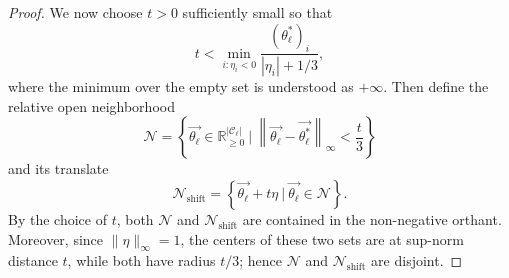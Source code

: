 \documentclass[pdflatex,sn-mathphys-num]{sn-jnl}%
\theoremstyle{thmstyleone}%
\theoremstyle{thmstyletwo}%
\theoremstyle{thmstylethree}%
\begin{document}
\begin{appendices}
\begin{proof}
    We now choose $t>0$ sufficiently small so that
    \[
        t < \min_{i:\eta_i<0} \frac{(\theta^*_\ell)_i}{|\eta_i| + 1/3},
    \]
    where the minimum over the empty set is understood as $+\infty$.
    Then define the relative open neighborhood
    \[
        \mathcal N = \left\{\overrightarrow{\theta_\ell} \in \mathbb R^{|\mathcal C_\ell|}_{\geq 0} ~\Big|~
        \left\|\overrightarrow{\theta_\ell}-\overrightarrow{\theta^*_\ell}\right\|_{\infty} < \frac{t}{3}
        \right\}
    \]
    and its translate
    \[
        \mathcal N_\text{shift} = \left\{ \overrightarrow{\theta_\ell} + t\eta ~\Big|~ \overrightarrow{\theta_\ell} \in \mathcal N \right\}.
    \]
    By the choice of $t$, both $\mathcal N$ and $\mathcal N_\text{shift}$ are contained in the non-negative orthant.
    Moreover, since $\|\eta\|_\infty = 1$, the centers of these two sets are at sup-norm distance $t$, while both have radius $t/3$; hence $\mathcal N$ and $\mathcal N_\text{shift}$ are disjoint.


\end{proof}
\end{appendices}
\end{document}
